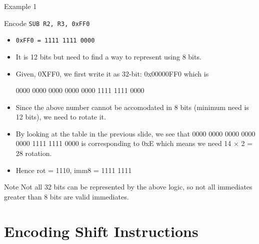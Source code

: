 \documentclass[aspectratio=169]{beamer}
\begin{document}
\begin{frame}{Example 1}
    
    \begin{tcolorbox}[
        enhanced,
        colback=androidBlueLight,
        colframe=androidBlue,
        arc=5pt,
        boxrule=1pt,
        title=\textbf{},
        fonttitle=\bfseries,
        coltitle=black,
        top=10pt,
        bottom=8pt,
        left=8pt,
        right=8pt,
        attach boxed title to top left={xshift=10pt, yshift=-\tcboxedtitleheight/2},
        boxed title style={
        colback=androidBlue,    
            colframe=androidBlue,
            arc=3pt,
            boxrule=0pt,
            left=6pt, right=6pt,
            top=3pt, bottom=3pt
        }
        ]
        Encode   \texttt{SUB R2, R3, 0xFF0}
    \end{tcolorbox}

    \begin{itemize}
        \item \texttt{0xFF0 = 1111 1111 0000}
        \item It is 12 bits but need to find a way to represent using 8 bits.
        \item Given, 0XFF0, we first write it as 32-bit: 0x00000FF0 which is
        
        0000 0000 0000 0000 0000 1111 1111 0000
        \item Since the above number cannot be accomodated in 8 bits (minimum need is 12 bits), we need to rotate it.
        \item By looking at the table in the previous slide, we see that 0000 0000 0000 0000 0000 1111 1111 0000 is corresponding to 0xE which means we need 14 $\times$ 2 = 28 rotation.
        \item Hence rot = 1110, imm8 = 1111 1111
    \end{itemize}
    
\end{frame}

\begin{frame}{Note}
    Not all 32 bits can be represented by the above logic, so not all immediates greater than 8 bits are valid immediates.
\end{frame}

\section{Encoding Shift Instructions}

\begin{frame}
    \sectionpage
\end{frame}
\end{document}

